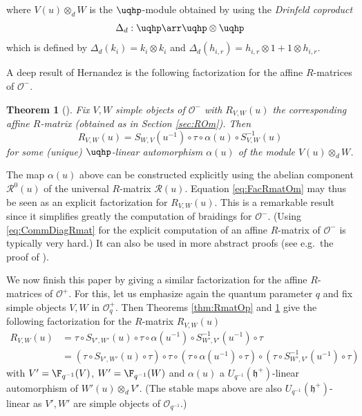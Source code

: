 \documentclass[11pt]{amsart}
\newtheorem{theorem}{Theorem}[section]
\theoremstyle{definition}
\theoremstyle{remark}
\numberwithin{equation}{section}
\begin{document}
where $V(u)\otimes_d W$ is the $\uqhp$-module obtained by using the \textit{Drinfeld coproduct} $$\Delta_d:\uqhp\arr\uqhp\otimes\uqhp$$
which is defined by $\Delta_d(k_i)=k_i\otimes k_i$ and $\Delta_d(h_{i,r})=h_{i,r}\otimes 1+1\otimes h_{i,r}$.\par
A deep result of Hernandez is the following factorization for the affine $R$-matrices of $\mathcal{O}^-$.
\begin{theorem}[{\cite[Section 5]{her}}]\label{thm:RmatFacOm} Fix $V,W$ simple objects of $\mathcal{O}^-$ with $R_{V,W}(u)$ the corresponding affine $R$-matrix (obtained as in Section \ref{sec:ROm}). Then 
\begin{equation}\label{eq:FacRmatOm} R_{V,W}(u) = S_{W,V}(u^{-1})\circ \tau\circ \alpha(u)\circ S_{V,W}^{-1}(u)
\end{equation}
for some (unique) $\uqhp$-linear automorphism  $\alpha(u)$ of the module $V(u)\otimes_d W$. 
\end{theorem}
The map $\alpha(u)$ above can be constructed explicitly using the abelian component $\mathcal{R}^0(u)$ of the universal $R$-matrix $\mathcal{R}(u)$. Equation \eqref{eq:FacRmatOm} may thus be seen as an explicit factorization for $R_{V,W}(u)$. This is a remarkable result since it simplifies greatly the computation of braidings for $\mathcal{O}^-$. (Using \eqref{eq:CommDiagRmat} for the explicit computation of an affine $R$-matrix of $\mathcal{O}^-$ is typically very hard.) 
It can also be used in more abstract proofs (see e.g.~the proof of \cite[Theorem 5.16]{her}).\par 
We now finish this paper by giving a similar factorization for the affine $R$-matrices of $\mathcal{O}^+$. For this, let us emphasize again the quantum parameter $q$ and fix simple objects $V,W$ in $\mathcal{O}^+_q$. Then Theorems \ref{thm:RmatOp} and \ref{thm:RmatFacOm} give the following factorization for the $R$-matrix $R_{V,W}(u)$
\begin{align*} R_{V,W}(u) &= \tau \circ S_{V',W'}(u)\circ \tau \circ \alpha(u^{-1})\circ S_{W',V'}^{-1}(u^{-1}) \circ \tau\\
&= (\tau \circ S_{V',W'}(u) \circ \tau)\circ\tau \circ (\tau \circ \alpha(u^{-1})\circ\tau) \circ (\tau \circ S_{W',V'}^{-1}(u^{-1})\circ \tau)
\end{align*}
with $V' = \F_{q^{-1}}(V)$, $W' = \F_{q^{-1}}(W)$ and $\alpha(u)$ a $U_{q^{-1}}(\mathfrak{h}^+)$-linear automorphism of $W'(u)\otimes_d V'$. (The stable maps above are also $U_{q^{-1}}(\mathfrak{h}^+)$-linear as $V',W'$ are simple objects of $\mathcal{O}_{q^{-1}}$.) \par 
\end{document}
